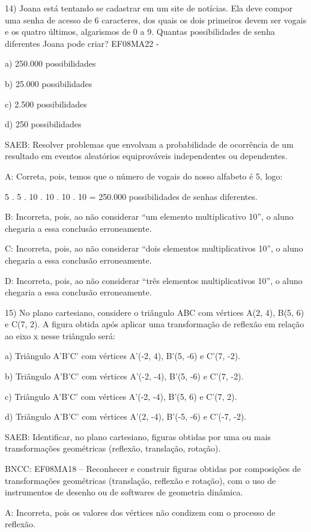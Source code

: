 14) Joana está tentando se cadastrar em um site de notícias. Ela deve
compor uma senha de acesso de 6 caracteres, dos quais os dois primeiros
devem ser vogais e os quatro últimos, algarismos de 0 a 9. Quantas
possibilidades de senha diferentes Joana pode criar? EF08MA22 -

a) 250.000 possibilidades

b) 25.000 possibilidades

c) 2.500 possibilidades

d) 250 possibilidades

SAEB: Resolver problemas que envolvam a probabilidade de ocorrência de
um resultado em eventos aleatórios equiprováveis independentes ou
dependentes.

A: Correta, pois, temos que o número de vogais do nosso alfabeto é 5,
logo:

5 . 5 . 10 . 10 . 10 . 10 = 250.000 possibilidades de senhas diferentes.

B: Incorreta, pois, ao não considerar ``um elemento multiplicativo 10'',
o aluno chegaria a essa conclusão erroneamente.

C: Incorreta, pois, ao não considerar ``dois elementos multiplicativos
10'', o aluno chegaria a essa conclusão erroneamente.

D: Incorreta, pois, ao não considerar ``três elementos multiplicativos
10'', o aluno chegaria a essa conclusão erroneamente.

15) No plano cartesiano, considere o triângulo ABC com vértices A(2, 4),
B(5, 6) e C(7, 2). A figura obtida após aplicar uma transformação de
reflexão em relação ao eixo x nesse triângulo será:

a) Triângulo A'B'C' com vértices A'(-2, 4), B'(5, -6) e C'(7, -2).

b) Triângulo A'B'C' com vértices A'(-2, -4), B'(5, -6) e C'(7, -2).

c) Triângulo A'B'C' com vértices A'(-2, -4), B'(5, 6) e C'(7, 2).

d) Triângulo A'B'C' com vértices A'(2, -4), B'(-5, -6) e C'(-7, -2).

SAEB: Identificar, no plano cartesiano, figuras obtidas por uma ou mais
transformações geométricas (reflexão, translação, rotação).

BNCC: EF08MA18 -- Reconhecer e construir figuras obtidas por composições
de transformações geométricas (translação, reflexão e rotação), com o
uso de instrumentos de desenho ou de softwares de geometria dinâmica.

A: Incorreta, pois os valores dos vértices não condizem com o processo
de reflexão.

